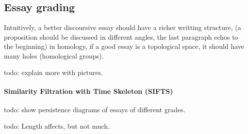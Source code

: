 \documentclass{article}
\begin{document}
\begin{figure}[htbp]
\centering

\end{figure}

\subsection{Essay grading}

Intuitively, a better discoursive essay should have a
richer writting structure, (a proposition should be discussed
in different angles, the last paragraph echos to the beginning)
in homology, if a good essay is a topological space, it should have
many holes (homological groups).

todo: explain more with pictures.


\paragraph{Similarity Filtration with Time Skeleton (SIFTS) \cite{Zhu_2013}}

todo: show persistence diagrams of essays of different grades.

todo: Length affects, but not much.

\printbibliography
\end{document}
